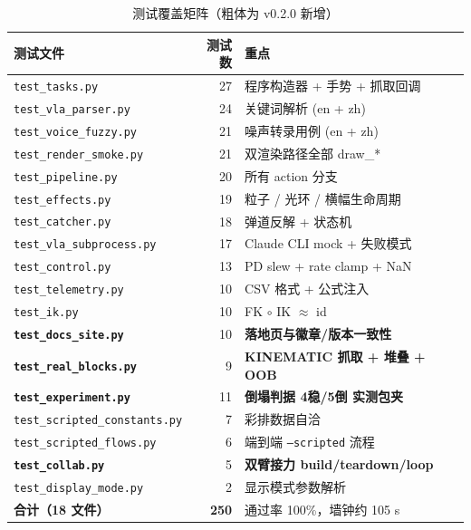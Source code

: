 \documentclass[12pt, a4paper, UTF8]{ctexart}
\begin{document}
\begin{table}[h]
\centering
\small
\caption{测试覆盖矩阵（粗体为 v0.2.0 新增）}
\label{tab:tests}
\begin{tabular}{lrl}
\toprule
测试文件 & 测试数 & 重点 \\
\midrule
\texttt{test\_tasks.py}               & 27 & 程序构造器 + 手势 + 抓取回调 \\
\texttt{test\_vla\_parser.py}         & 24 & 关键词解析 (en + zh) \\
\texttt{test\_voice\_fuzzy.py}        & 21 & 噪声转录用例 (en + zh) \\
\texttt{test\_render\_smoke.py}       & 21 & 双渲染路径全部 draw\_* \\
\texttt{test\_pipeline.py}            & 20 & 所有 action 分支 \\
\texttt{test\_effects.py}             & 19 & 粒子 / 光环 / 横幅生命周期 \\
\texttt{test\_catcher.py}             & 18 & 弹道反解 + 状态机 \\
\texttt{test\_vla\_subprocess.py}     & 17 & Claude CLI mock + 失败模式 \\
\texttt{test\_control.py}             & 13 & PD slew + rate clamp + NaN \\
\texttt{test\_telemetry.py}           & 10 & CSV 格式 + 公式注入 \\
\texttt{test\_ik.py}                  & 10 & FK $\circ$ IK $\approx$ id \\
\textbf{\texttt{test\_docs\_site.py}} & 10 & \textbf{落地页与徽章/版本一致性} \\
\textbf{\texttt{test\_real\_blocks.py}} &  9 & \textbf{KINEMATIC 抓取 + 堆叠 + OOB} \\
\textbf{\texttt{test\_experiment.py}} & 11 & \textbf{倒塌判据 4稳/5倒 实测包夹} \\
\texttt{test\_scripted\_constants.py} &  7 & 彩排数据自洽 \\
\texttt{test\_scripted\_flows.py}     &  6 & 端到端 \texttt{--scripted} 流程 \\
\textbf{\texttt{test\_collab.py}}     &  5 & \textbf{双臂接力 build/teardown/loop} \\
\texttt{test\_display\_mode.py}       &  2 & 显示模式参数解析 \\
\midrule
\textbf{合计（18 文件）}              & \textbf{250} & 通过率 100\%，墙钟约 105 s \\
\bottomrule
\end{tabular}
\end{table}
\end{document}
